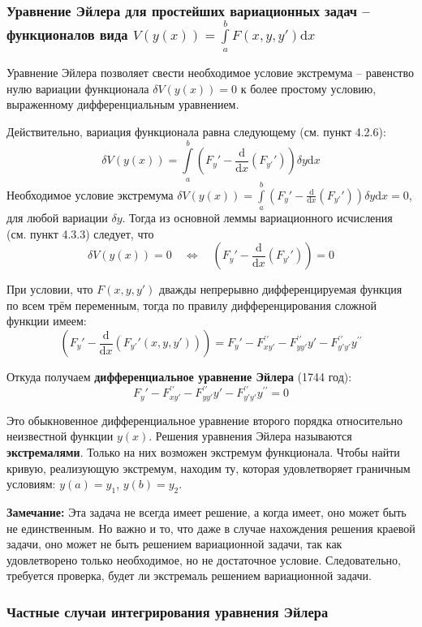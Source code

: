\documentclass[12pt, a4paper]{article}
\newcommand{\di}{\mathrm{d}}
\begin{document}
\subsubsection[Уравнение Эйлера для простейших вариационных задач]{Уравнение Эйлера для простейших вариационных задач -- функционалов вида $V(y(x)) = \int \limits_a^b F(x, y, y') \di x$}

Уравнение Эйлера позволяет свести необходимое условие экстремума -- равенство нулю вариации функционала $\delta V(y(x)) = 0$ к более простому условию, выраженному дифференциальным уравнением.

Действительно, вариация функционала равна следующему (см. пункт 4.2.6):
\[\delta V(y(x)) = \int \limits_a^b \left( F_y' - \frac{\di}{\di x} (F_{y'}') \right) \delta y \di x \]
Необходимое условие экстремума $\delta V(y(x)) = \int \limits_a^b \left( F_y' - \frac{\di}{\di x} (F_{y'}') \right) \delta y \di x = 0$, для любой вариации $\delta y$. Тогда из основной леммы вариационного исчисления (см. пункт 4.3.3) следует, что
\[\delta V(y(x)) = 0 \quad \Leftrightarrow \quad \left( F_y' - \frac{\di}{\di x} (F_{y'}') \right) = 0 \]

При условии, что $F(x, y, y')$ дважды непрерывно дифференцируемая функция по всем трём переменным, тогда по правилу дифференцирования сложной функции имеем:
\[\left( F_y' - \frac{\di}{\di x} (F_{y'}' (x, y, y')) \right) = F_y' - F_{xy'}^{\prime \prime} - F_{yy'}^{\prime \prime} y' - F_{y'y'}^{\prime \prime} y^{\prime \prime} \]

Откуда получаем \textbf{дифференциальное уравнение Эйлера} (1744 год):
\[F_y' - F_{xy'}^{\prime \prime} - F_{yy'}^{\prime \prime} y' - F_{y'y'}^{\prime \prime} y^{\prime \prime} = 0 \]

Это обыкновенное дифференциальное уравнение второго порядка относительно неизвестной функции $y(x)$. Решения уравнения Эйлера называются \textbf{экстремалями}. Только на них возможен экстремум функционала. Чтобы найти кривую, реализующую экстремум, находим ту, которая удовлетворяет граничным условиям: $y(a)=y_1$, $y(b)=y_2$.

\textbf{Замечание:} Эта задача не всегда имеет решение, а когда имеет, оно может быть не единственным. Но важно и то, что даже в случае нахождения решения краевой задачи, оно может не быть решением вариационной задачи, так как удовлетворено только необходимое, но не достаточное условие. Следовательно, требуется проверка, будет ли экстремаль решением вариационной задачи.

\subsubsection{Частные случаи интегрирования уравнения Эйлера}
\end{document}
